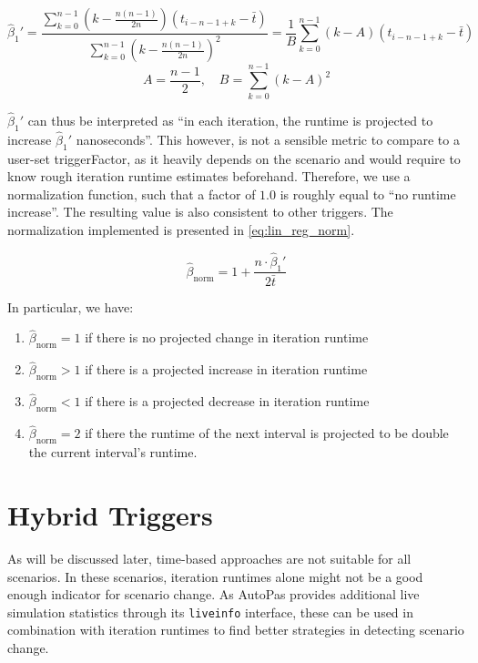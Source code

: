 \begin{equation}
	\hat{\beta}_1' =\frac{\sum_{k=0}^{n-1}\left(k-\frac{n(n-1)}{2n}\right)(t_{i-n-1+k}-\bar t)}{\sum_{k=0}^{n-1}\left(k-\frac{n(n-1)}{2n}\right)^2}= \frac{1}{B}\sum_{k=0}^{n-1}\left(k-A\right)(t_{i-n-1+k}-\bar t)\label{eq:lin_reg_simpl}
\end{equation}
\begin{equation}
	A = \frac{n-1}{2}, \quad B=\sum_{k=0}^{n-1}\left(k-A\right)^2\label{eq:lin_reg_consts}
\end{equation}

$\hat\beta_1'$ can thus be interpreted as \enquote{in each iteration, the runtime is projected to increase $\hat\beta_1'$ nanoseconds}. This however, is not a sensible metric to compare to a user-set triggerFactor, as it heavily depends on the scenario and would require to know rough iteration runtime estimates beforehand. Therefore, we use a normalization function, such that a factor of $1.0$ is roughly equal to \enquote{no runtime increase}. The resulting value is also consistent to other triggers. The normalization implemented is presented in \eqref{eq:lin_reg_norm}.


\begin{equation}
	\hat\beta_{\text{norm}} = 1+\frac{n\cdot\hat\beta_1'}{2\bar t}\label{eq:lin_reg_norm}
\end{equation}

In particular, we have:

\begin{enumerate}[label=(\roman*)]
	\item $\hat\beta_{\text{norm}} = 1$ if there is no projected change in iteration runtime
	\item $\hat\beta_{\text{norm}} > 1$ if there is a projected increase in iteration runtime
	\item $\hat\beta_{\text{norm}} < 1$ if there is a projected decrease in iteration runtime
	\item $\hat\beta_{\text{norm}} = 2$ if there the runtime of the next interval is projected to be double the current interval's runtime.
\end{enumerate}

\section{Hybrid Triggers}
As will be discussed later, time-based approaches are not suitable for all scenarios. In these scenarios, iteration runtimes alone might not be a good enough indicator for scenario change. As AutoPas provides additional live simulation statistics through its \texttt{liveinfo} interface, these can be used in combination with iteration runtimes to find better strategies in detecting scenario change.


